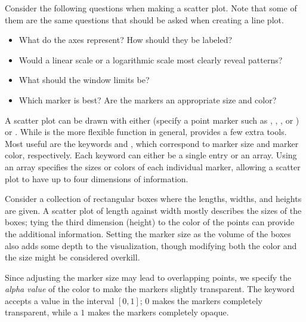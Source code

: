 Consider the following questions when making a scatter plot.
Note that some of them are the same questions that should be asked when creating a line plot.
%
\begin{itemize}
    \item What do the axes represent? How should they be labeled?
    \item Would a linear scale or a logarithmic scale most clearly reveal patterns?
    \item What should the window limits be?
    \item Which marker is best? Are the markers an appropriate size and color?
\end{itemize}

A scatter plot can be drawn with either  (specify a point marker such as , , , or ) or .
While  is the more flexible function in general,  provides a few extra tools.
Most useful are the keywords  and , which correspond to marker size and marker color, respectively.
Each keyword can either be a single entry or an array.
Using an array specifies the sizes or colors of each individual marker, allowing a scatter plot to have up to four dimensions of information.

Consider a collection of rectangular boxes where the lengths, widths, and heights are given.
A scatter plot of length against width mostly describes the sizes of the boxes; tying the third dimension (height) to the color of the points can provide the additional information.
Setting the marker size as the volume of the boxes also adds some depth to the visualization, though modifying both the color and the size might be considered overkill.

Since adjusting the marker size may lead to overlapping points, we specify the \emph{alpha value} of the color to make the markers slightly transparent.
The keyword  accepts a value in the interval $[0,1]$; 0 makes the markers completely transparent, while a $1$ makes the markers completely opaque.

